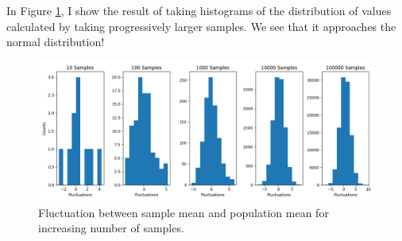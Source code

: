 \documentclass{article}
\begin{document}
In Figure \ref{fig:clt}, I show the result of taking histograms of the distribution of values calculated by taking progressively larger samples. We see that it approaches the normal distribution!

\begin{figure}[htbp]
\centerline{\includegraphics[width = \textwidth]{clt.png}}
\caption[]{\label{fig:clt} Fluctuation between sample mean and population mean for increasing number of samples. }
\end{figure}
\end{document}
